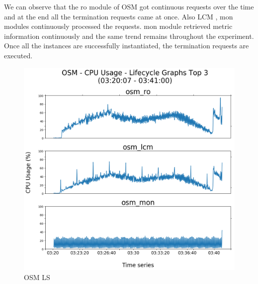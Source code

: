 We can observe that the ro module of OSM got continuous requests over the time and at the end all the termination requests came at once. Also LCM , mon modules continuously processed the requests. mon module retrieved metric information continuously and the same trend
remains throughout the experiment. Once all the instances are successfully instantiated, the termination requests are executed. 

\begin{figure}[h]
	\centering
	\includegraphics[width=1\linewidth]{figures/scalability_graphs/Lifecycle-Graphs-Top-3/OSM-TOP-3-Lifecycle}
	\caption{OSM LS}
	\label{fig:osm-top-3-lifecycle}
\end{figure}
